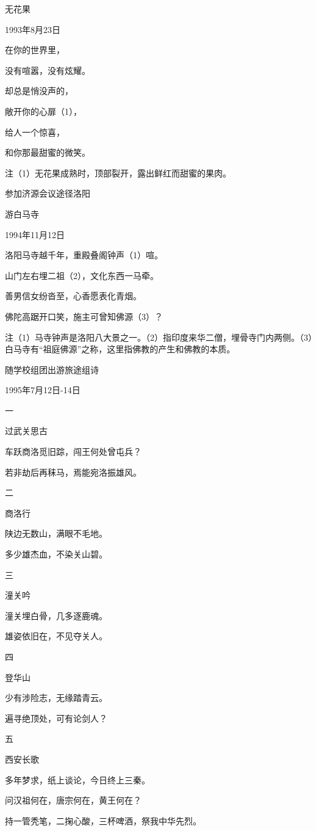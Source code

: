 \documentclass[../../dazhuan.tex]{subfiles}
\begin{document}
无花果

1993年8月23日

在你的世界里，

没有喧嚣，没有炫耀。

却总是悄没声的，

敞开你的心扉（1），

给人一个惊喜，

和你那最甜蜜的微笑。

注（1）无花果成熟时，顶部裂开，露出鲜红而甜蜜的果肉。



参加济源会议途径洛阳

游白马寺

1994年11月12日

洛阳马寺越千年，重殿叠阁钟声（1）喧。

山门左右埋二祖（2），文化东西一马牵。

善男信女纷沓至，心香愿表化青烟。

佛陀高踞开口笑，施主可曾知佛源（3）？

注（1）马寺钟声是洛阳八大景之一。（2）指印度来华二僧，埋骨寺门内两侧。（3）白马寺有“祖庭佛源”之称，这里指佛教的产生和佛教的本质。



随学校组团出游旅途组诗

1995年7月12日-14日

一

过武关思古

车跃商洛觅旧踪，闯王何处曾屯兵？

若非劫后再秣马，焉能宛洛振雄风。

二

商洛行

陕边无数山，满眼不毛地。

多少雄杰血，不染关山碧。

三

潼关吟

潼关埋白骨，几多逐鹿魂。

雄姿依旧在，不见夺关人。

四

登华山

少有涉险志，无缘踏青云。

遍寻绝顶处，可有论剑人？

五

西安长歌

多年梦求，纸上谈论，今日终上三秦。

问汉祖何在，唐宗何在，黄王何在？

持一管秃笔，二掬心酸，三杯啤酒，祭我中华先烈。
\end{document}
